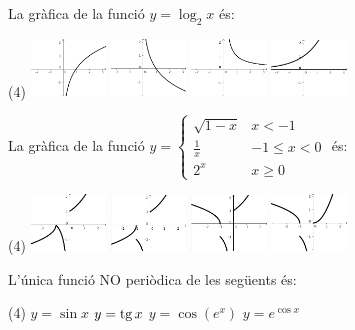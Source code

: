 \begin{autoaval}{55}
\begin{mylist}
\exer La gràfica de la funció $y=\log_{2} x$ és:
\begin{tasks}(4)
	\task  \includegraphics*[width=2cm]{img-05/chap-fe-autoaval-opta}
	\task  \includegraphics*[width=2cm]{img-05/chap-fe-autoaval-optb}
	\task  \includegraphics*[width=2cm]{img-05/chap-fe-autoaval-optc}
	\task  \includegraphics*[width=2cm]{img-05/chap-fe-autoaval-optd}
\end{tasks}


\exer La gràfica de la funció $y=\left\{\begin{array}{ll} 
		\sqrt{1-x} & x<-1 \\ \frac{1}{x} & -1 \leq x <0 \\ 2^x & x\geq 0
	 \end{array}  \right.$ és:
\begin{tasks}(4)
	\task  \includegraphics*[width=2cm]{img-05/chap-fe-autoaval-eea}
	\task  \includegraphics*[width=2cm]{img-05/chap-fe-autoaval-eeb}
	\task  \includegraphics*[width=2cm]{img-05/chap-fe-autoaval-eec}
	\task  \includegraphics*[width=2cm]{img-05/chap-fe-autoaval-eed}
\end{tasks}

\exer L'única funció NO periòdica de les següents és:
\begin{tasks}(4)
	\task $y=\sin x$
	\task $y=\mathrm{tg}\, x$ 
	\task  $y=\cos(e^x) $
	\task  $y=e^{\cos x}$
\end{tasks}

\end{mylist}
\end{autoaval}

